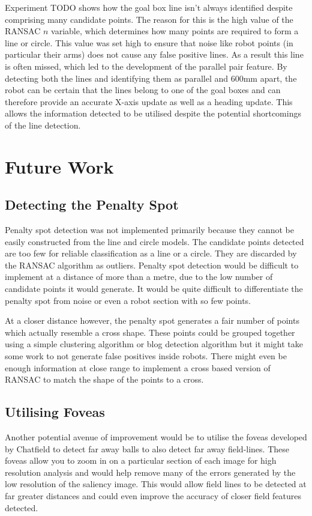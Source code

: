 \documentclass{article}
\begin{document}
Experiment TODO shows how the goal box line isn't always identified despite comprising many candidate points. The reason for this is the high value of the RANSAC $n$ variable, which determines how many points are required to form a line or circle. This value was set high to ensure that noise like robot points (in particular their arms) does not cause any false positive lines. As a result this line is often missed, which led to the development of the parallel pair feature. By detecting both the lines and identifying them as parallel and 600mm apart, the robot can be certain that the lines belong to one of the goal boxes and can therefore provide an accurate X-axis update as well as a heading update. This allows the information detected to be utilised despite the potential shortcomings of the line detection.


\section{Future Work}
\subsection{Detecting the Penalty Spot}
Penalty spot detection was not implemented primarily because they cannot be easily constructed from the line and circle models. The candidate points detected are too few for reliable classification as a line or a circle. They are discarded by the RANSAC algorithm as outliers. Penalty spot detection would be difficult to implement at a distance of more than a metre, due to the low number of candidate points it would generate. It would be quite difficult to differentiate the penalty spot from noise or even a robot section with so few points.

At a closer distance however, the penalty spot generates a fair number of points which actually resemble a cross shape. These points could be grouped together using a simple clustering algorithm or blog detection algorithm but it might take some work to not generate false positives inside robots. There might even be enough information at close range to implement a cross based version of RANSAC to match the shape of the points to a cross.

\subsection{Utilising Foveas}
Another potential avenue of improvement would be to utilise the foveas developed by Chatfield  to detect far away balls to also detect far away field-lines. These foveas allow you to zoom in on a particular section of each image for high resolution analysis and would help remove many of the errors generated by the low resolution of the saliency image. This would allow field lines to be detected at far greater distances and could even improve the accuracy of closer field features detected.
\end{document}
